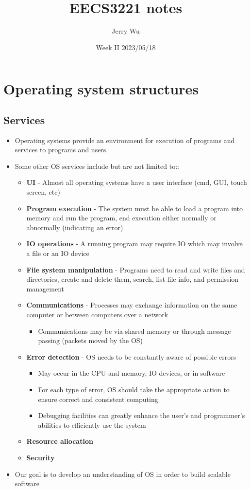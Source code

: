 \documentclass[12pt]{book}
\title{EECS3221 notes}
\author{Jerry Wu}
\date{Week II 2023/05/18}
\begin{document}
\maketitle
\chapter*{Operating system structures}

\section*{Services}

\begin{itemize}
    \item Operating systems provide an environment for execution of programs and services to programs and users.
    \item Some other OS services include but are not limited to::
    \begin{itemize}
        \item \textbf{UI} - Almost all operating systems have a user interface (cmd, GUI, touch screen, etc)
        \item \textbf{Program execution} - The system must be able to load a program into memory and run the program, end execution either normally or abnormally (indicating an error)
        \item \textbf{IO operations} - A running program may require IO which may involve a file or an IO device
        \item \textbf{File system manipulation} - Programs need to read and write files and directories, create and delete them, search, list file info, and permission management
        \item \textbf{Communications} - Processes may exchange information on the same computer or between computers over a network
        \begin{itemize}
            \item Communications may be via shared memory or through message passing (packets moved by the OS)
        \end{itemize} 
        \item \textbf{Error detection} - OS needs to be constantly aware of possible errors
        \begin{itemize}
            \item May occur in the CPU and memory, IO devices, or in software
            \item For each type of error, OS should take the appropriate action to ensure correct and consistent computing
            \item Debugging facilities can greatly enhance the user's and programmer's abilities to efficiently use the system
        \end{itemize}
        \item \textbf{Resource allocation}
        \item \textbf{Security}
    \end{itemize}
    \item Our goal is to develop an understanding of OS in order to build scalable software
\end{itemize}
\end{document}
